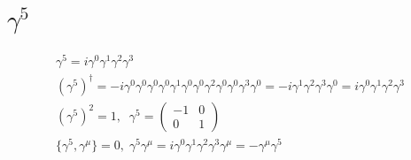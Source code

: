 \documentclass[]{scrartcl}
\begin{document}
\section{$\gamma^5$}
\begin{gather}
	\gamma^5 = i\gamma^0\gamma^1\gamma^2\gamma^3\\
	(\gamma^5)^\dagger = -i \gamma^0\gamma^0\gamma^0 \gamma^0\gamma^1\gamma^0 \gamma^0\gamma^2\gamma^0 \gamma^0\gamma^3\gamma^0 = -i\gamma^1\gamma^2\gamma^3\gamma^0 = i\gamma^0\gamma^1\gamma^2\gamma^3\\
	(\gamma^5)^2 = 1, \;\; \gamma^5 =
	\begin{pmatrix}
		- 1 & 0\\ 0 & 1
	\end{pmatrix}\\
	\{\gamma^5, \gamma^\mu\} = 0,\; \gamma^5\gamma^\mu = i\gamma^0\gamma^1\gamma^2\gamma^3\gamma^\mu = -\gamma^\mu\gamma^5
\end{gather}
\end{document}
